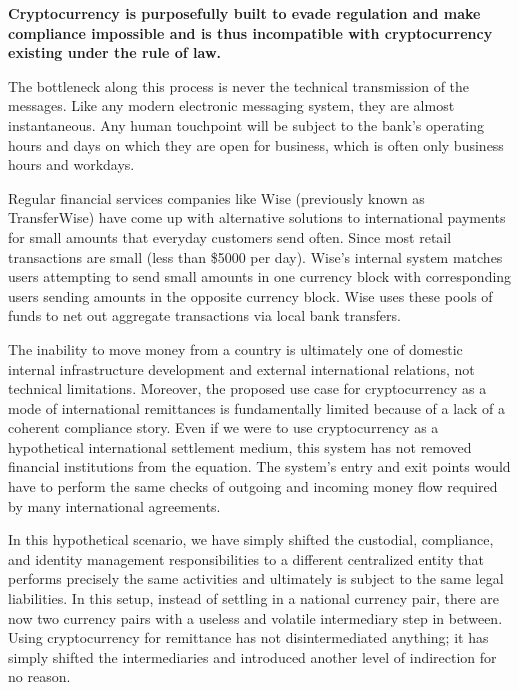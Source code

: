
\begin{infobox}
 \textbf{
   Cryptocurrency is purposefully built to evade regulation and make compliance
   impossible and is thus incompatible with cryptocurrency existing under the
   rule of law.
  }
\end{infobox}

The bottleneck along this process is never the technical transmission of the
messages. Like any modern electronic messaging system, they are almost
instantaneous. Any human touchpoint will be subject to the bank's operating
hours and days on which they are open for business, which is often only business
hours and workdays.

Regular financial services companies like Wise (previously known as
TransferWise) have come up with alternative solutions to international payments
for small amounts that everyday customers send often. Since most retail
transactions are small (less than \$5000 per day). Wise's internal system
matches users attempting to send small amounts in one currency block with
corresponding users sending amounts in the opposite currency block.  Wise uses
these pools of funds to net out aggregate transactions via local bank transfers.

The inability to move money from a country is ultimately one of domestic
internal infrastructure development and external international relations, not
technical limitations. Moreover, the proposed use case for cryptocurrency as a
mode of international remittances is fundamentally limited because of a lack of
a coherent compliance story. Even if we were to use cryptocurrency as a
hypothetical international settlement medium, this system has not removed
financial institutions from the equation. The system's entry and exit points
would have to perform the same checks of outgoing and incoming money flow
required by many international agreements.


In this hypothetical scenario, we have simply shifted the custodial, compliance,
and identity management responsibilities to a different centralized entity that
performs precisely the same activities and ultimately is subject to the same
legal liabilities. In this setup, instead of settling in a national currency
pair, there are now two currency pairs with a useless and volatile intermediary
step in between. Using cryptocurrency for remittance has not disintermediated
anything; it has simply shifted the intermediaries and introduced another level
of indirection for no reason.

